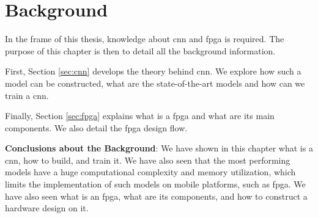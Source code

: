 \chapter{Background} \label{chap:background}
In the frame of this thesis, knowledge about \acrshort{cnn} and \acrshort{fpga} is required. The purpose of this chapter is then to detail all the background information.

First, Section \ref{sec:cnn} develops the theory behind \acrshort{cnn}. We explore how such a model can be constructed, what are the state-of-the-art models and how can we train a \acrshort{cnn}.

Finally, Section \ref{sec:fpga} explains what is a \acrshort{fpga} and what are its main components. We also detail the \acrshort{fpga} design flow.


%
\begin{tcolorbox}
    \textbf{Conclusions about the Background}: \newline \newline
    We have shown in this chapter what is a \acrshort{cnn}, how to build, and train it. We have also seen that the most performing models have a huge computational complexity and memory utilization, which limits the implementation of such models on mobile platforms, such as \acrshort{fpga}. We have also seen what is an \acrshort{fpga}, what are its components, and how to construct a hardware design on it.
\end{tcolorbox}
% 
\afterpage{\blankpage}
\cleardoublepage
\newpage
